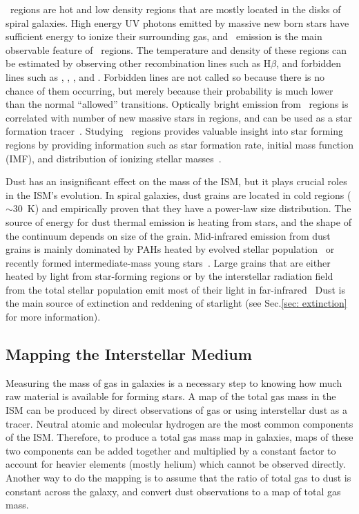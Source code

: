 \hii~regions are hot and low density regions that are mostly located in the disks of spiral galaxies.
High energy UV photons emitted by massive new born stars have sufficient energy to ionize their surrounding gas, and
~\halpha emission is the main observable feature of \hii~regions.
The temperature and density of these regions can be estimated by observing other recombination lines such as H$\beta$, and forbidden lines such as \sii, \oii, \oiii, and \nii. 
Forbidden lines are not called so because there is no chance of them occurring, but merely because their probability is much lower than the normal ``allowed'' transitions.
Optically bright \halpha emission from \hii~regions is correlated with number of new massive stars in regions, and can be used as a star formation tracer~\citep[e.g.][]{Kennicutt98b,Calzetti13}.
Studying \hii~regions provides valuable insight into star forming regions by providing information such as star formation rate, initial mass function (IMF), and distribution of ionizing stellar masses~\citep[][and references therein]{Azimlu11}.


Dust has an insignificant effect on the mass of the ISM, but it plays crucial roles in the ISM's evolution.
In spiral galaxies, dust grains are located in cold regions ($\sim$30~K) and empirically proven that they have a power-law size distribution.
The source of energy for dust thermal emission is heating from stars, and the shape of the continuum depends on size of the grain.
Mid-infrared emission from dust grains is mainly dominated by PAHs heated by evolved stellar population~\citep{Smith07a} or recently formed intermediate-mass young stars~\citep{Peeters04}.
Large grains that are either heated by light from star-forming regions or by the interstellar radiation field from the total stellar population emit most of their light in far-infrared~\citep[e.g.][]{Calapa14, lu14}
Dust is the main source of extinction and reddening of starlight (see Sec.\ref{sec: extinction} for more information).

\subsection{Mapping the Interstellar Medium} 
\label{sec: ismmap}
Measuring the mass of gas in galaxies is a necessary step to knowing how much raw material is available for forming stars.
A map of the total gas mass in the ISM can be produced by direct observations of gas or using interstellar dust as a tracer. 
Neutral atomic and molecular hydrogen are the most common components of the ISM. 
Therefore, to produce a total gas mass map in galaxies, maps of these two components can be added together and multiplied by a constant factor to account for heavier elements (mostly helium) which cannot be observed directly. 
Another way to do the mapping is to assume that the ratio of total gas to dust is constant across the galaxy, and convert dust observations to a map of total gas mass.

